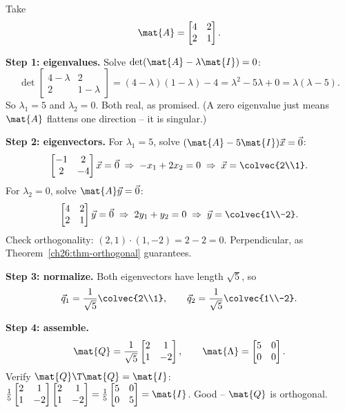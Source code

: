 \begin{example}
\label{ch26:ex-full-2x2}
Take
\[
  \mat{A} = \begin{bmatrix} 4 & 2 \\ 2 & 1 \end{bmatrix}.
\]

\textbf{Step 1: eigenvalues.} Solve $\det(\mat{A}-\lambda\mat{I})=0$:
\[
  \det\begin{bmatrix} 4-\lambda & 2 \\ 2 & 1-\lambda \end{bmatrix}
  = (4-\lambda)(1-\lambda) - 4
  = \lambda^2 - 5\lambda + 0 = \lambda(\lambda - 5).
\]
So $\lambda_1 = 5$ and $\lambda_2 = 0$. Both real, as promised. (A zero
eigenvalue just means $\mat{A}$ flattens one direction -- it is singular.)

\textbf{Step 2: eigenvectors.} For $\lambda_1 = 5$, solve $(\mat{A}-5\mat{I})\vec{x}=\vec{0}$:
\[
  \begin{bmatrix} -1 & 2 \\ 2 & -4 \end{bmatrix}\vec{x}=\vec{0}
  \;\Rightarrow\; -x_1 + 2x_2 = 0 \;\Rightarrow\; \vec{x}=\colvec{2\\1}.
\]
For $\lambda_2 = 0$, solve $\mat{A}\vec{y}=\vec{0}$:
\[
  \begin{bmatrix} 4 & 2 \\ 2 & 1 \end{bmatrix}\vec{y}=\vec{0}
  \;\Rightarrow\; 2y_1 + y_2 = 0 \;\Rightarrow\; \vec{y}=\colvec{1\\-2}.
\]
Check orthogonality: $(2,1)\cdot(1,-2) = 2 - 2 = 0$. Perpendicular, as
Theorem~\ref{ch26:thm-orthogonal} guarantees.

\textbf{Step 3: normalize.} Both eigenvectors have length $\sqrt{5}$, so
\[
  \vec{q}_1 = \frac{1}{\sqrt5}\colvec{2\\1},\qquad
  \vec{q}_2 = \frac{1}{\sqrt5}\colvec{1\\-2}.
\]

\textbf{Step 4: assemble.}
\[
  \mat{Q} = \frac{1}{\sqrt5}\begin{bmatrix} 2 & 1 \\ 1 & -2 \end{bmatrix},
  \qquad
  \mat{\Lambda} = \begin{bmatrix} 5 & 0 \\ 0 & 0 \end{bmatrix}.
\]
Verify $\mat{Q}\T\mat{Q}=\mat{I}$:
$\frac15\begin{bmatrix}2&1\\1&-2\end{bmatrix}\begin{bmatrix}2&1\\1&-2\end{bmatrix}
=\frac15\begin{bmatrix}5&0\\0&5\end{bmatrix}=\mat{I}$. Good -- $\mat{Q}$ is
orthogonal.


\end{example}
